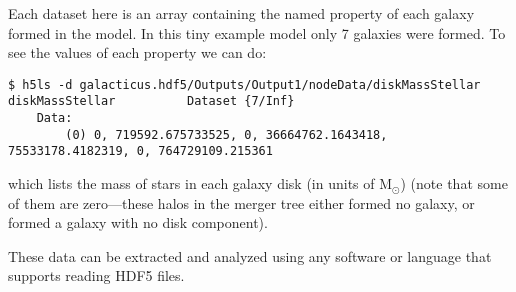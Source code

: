 Each dataset here is an array containing the named property of each galaxy formed in the model. In this tiny example model only 7 galaxies were formed. To see the values of each property we can do:
\begin{verbatim}
$ h5ls -d galacticus.hdf5/Outputs/Output1/nodeData/diskMassStellar
diskMassStellar          Dataset {7/Inf}
    Data:
        (0) 0, 719592.675733525, 0, 36664762.1643418, 75533178.4182319, 0, 764729109.215361
\end{verbatim}
which lists the mass of stars in each galaxy disk (in units of $\mathrm{M}_\odot$) (note that some of them are zero---these halos in the merger tree either formed no galaxy, or formed a galaxy with no disk component).

These data can be extracted and analyzed using any software or language that supports reading HDF5 files.
